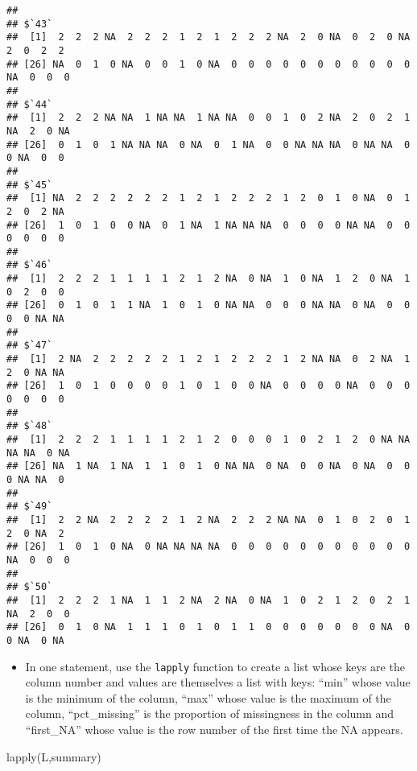 \documentclass[
]{article}
\newenvironment{Shaded}{\begin{snugshade}}{\end{snugshade}}
\newcommand{\FunctionTok}[1]{\textcolor[rgb]{0.00,0.00,0.00}{#1}}
\newcommand{\NormalTok}[1]{#1}
\providecommand{\tightlist}{%
  \setlength{\itemsep}{0pt}\setlength{\parskip}{0pt}}
\begin{document}
\begin{verbatim}
## 
## $`43`
##  [1]  2  2  2 NA  2  2  2  1  2  1  2  2  2 NA  2  0 NA  0  2  0 NA  2  0  2  2
## [26] NA  0  1  0 NA  0  0  1  0 NA  0  0  0  0  0  0  0  0  0  0  0 NA  0  0  0
## 
## $`44`
##  [1]  2  2  2 NA NA  1 NA NA  1 NA NA  0  0  1  0  2 NA  2  0  2  1 NA  2  0 NA
## [26]  0  1  0  1 NA NA NA  0 NA  0  1 NA  0  0 NA NA NA  0 NA NA  0  0 NA  0  0
## 
## $`45`
##  [1] NA  2  2  2  2  2  2  1  2  1  2  2  2  1  2  0  1  0 NA  0  1  2  0  2 NA
## [26]  1  0  1  0  0 NA  0  1 NA  1 NA NA NA  0  0  0  0 NA NA  0  0  0  0  0  0
## 
## $`46`
##  [1]  2  2  2  1  1  1  1  2  1  2 NA  0 NA  1  0 NA  1  2  0 NA  1  0  2  0  0
## [26]  0  1  0  1  1 NA  1  0  1  0 NA NA  0  0  0 NA NA  0 NA  0  0  0  0 NA NA
## 
## $`47`
##  [1]  2 NA  2  2  2  2  2  1  2  1  2  2  2  1  2 NA NA  0  2 NA  1  2  0 NA NA
## [26]  1  0  1  0  0  0  0  1  0  1  0  0 NA  0  0  0  0 NA  0  0  0  0  0  0  0
## 
## $`48`
##  [1]  2  2  2  1  1  1  1  2  1  2  0  0  0  1  0  2  1  2  0 NA NA NA NA  0 NA
## [26] NA  1 NA  1 NA  1  1  0  1  0 NA NA  0 NA  0  0 NA  0 NA  0  0  0 NA NA  0
## 
## $`49`
##  [1]  2  2 NA  2  2  2  2  1  2 NA  2  2  2 NA NA  0  1  0  2  0  1  2  0 NA  2
## [26]  1  0  1  0 NA  0 NA NA NA NA  0  0  0  0  0  0  0  0  0  0  0 NA  0  0  0
## 
## $`50`
##  [1]  2  2  2  1 NA  1  1  2 NA  2 NA  0 NA  1  0  2  1  2  0  2  1 NA  2  0  0
## [26]  0  1  0 NA  1  1  1  0  1  0  1  1  0  0  0  0  0  0  0 NA  0  0 NA  0 NA
\end{verbatim}

\begin{itemize}
\tightlist
\item
  In one statement, use the \texttt{lapply} function to create a list
  whose keys are the column number and values are themselves a list with
  keys: ``min'' whose value is the minimum of the column, ``max'' whose
  value is the maximum of the column, ``pct\_missing'' is the proportion
  of missingness in the column and ``first\_NA'' whose value is the row
  number of the first time the NA appears.
\end{itemize}

\begin{Shaded}
\begin{Highlighting}[]
\FunctionTok{lapply}\NormalTok{(L,summary)}
\end{Highlighting}
\end{Shaded}
\end{document}

